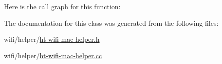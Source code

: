 Here is the call graph for this function\+:




The documentation for this class was generated from the following files\+:\begin{DoxyCompactItemize}
\item 
wifi/helper/\hyperlink{ht-wifi-mac-helper_8h}{ht-\/wifi-\/mac-\/helper.\+h}\item 
wifi/helper/\hyperlink{ht-wifi-mac-helper_8cc}{ht-\/wifi-\/mac-\/helper.\+cc}\end{DoxyCompactItemize}
